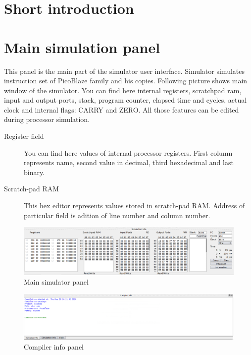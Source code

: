 \section{Short introduction}



\section{Main simulation panel}
    This panel is the main part of the simulator user interface. Simulator simulates instruction set of PicoBlaze family and his copies.
    Following picture shows main window of the simulator. You can find here internal registers, scratchpad ram, input and output ports, stack,
    program counter, elapsed time and cycles, actual clock and internal flags: CARRY and ZERO. All those features can be edited during
    processor simulation.
    \begin{description}
     \item [Register field] You can find here values of internal processor registers. First column represents name, second value in decimal, third
     hexadecimal and last binary.
     \item [Scratch-pad RAM] This hex editor represents values stored in scratch-pad RAM. Address of particular field is adition of line number
     and column number. 
    \end{description}

   \begin{figure}[h!]
        \centering
        \includegraphics[width=\textwidth]{img/bottom_panel.png}
        \caption{Main simulator panel}
    \end{figure}


   \begin{figure}[h!]
        \centering
        \includegraphics[width=\textwidth]{img/compiler_panel.png}
        \caption{Compiler info panel}
    \end{figure}

